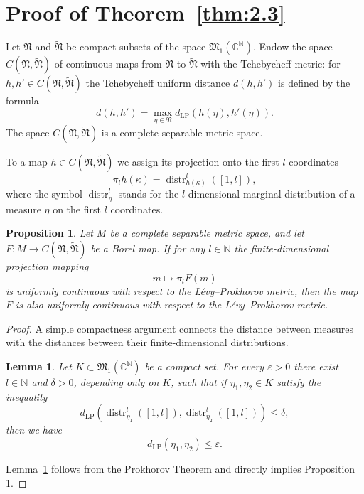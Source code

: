 \documentclass[12pt,a4paper]{article}
\newtheorem{lemma}[theorem]{Lemma}
\newtheorem{proposition}[theorem]{Proposition}
\theoremstyle{definition}
\theoremstyle{remark}
\newcommand{\MM}{{\mathfrak{M}}}
\newcommand{\NN}{{\mathfrak{N}}}
\begin{document}
	\section{Proof of Theorem~\ref{thm:2.3}}
	
	Let $\NN$ and $\widetilde{\NN}$ be compact subsets of the space $\MM_1(\mathbb{C}^{\mathbb{N}})$.
	Endow the space $C(\NN, \widetilde{\NN})$ of continuous maps from $\NN$ to $\widetilde{\NN}$ with the Tchebycheff metric:
	for $h, h' \in C(\NN, \widetilde{\NN})$ the Tchebycheff uniform distance $d(h, h')$ is defined by the formula
	\[
	d(h, h') = \max_{\eta \in \NN} d_{\mathrm{LP}}\left(h(\eta), h'(\eta)\right).
	\]
	The space $C(\NN, \widetilde{\NN})$ is a complete separable metric space.
	
	To a map $h \in C(\NN, \widetilde{\NN})$ we assign its projection onto the 
	first $l$ coordinates
	\[
	\pi_l h(\kappa) = \operatorname{distr}^l_{h(\kappa)}([1, l]),
	\]
	where the symbol $\operatorname{distr}^l_\eta$ stands for the $l$-dimensional marginal distribution of a measure $\eta$ on the first $l$ coordinates.
	
	\begin{proposition}
		\label{prop:3.1}
		Let $M$ be a complete separable metric space, and let  $F \colon M \to C(\NN, \widetilde{\NN})$ be a Borel map.  If for any $l \in \mathbb{N}$ the 
		 finite-dimensional projection mapping
		\[
		m \mapsto \pi_l F(m)
		\]
		is uniformly continuous with respect to the L\'evy--Prokhorov metric, then the map $F$ is also uniformly continuous with respect to the L\'evy--Prokhorov metric.
	\end{proposition}
	
	\begin{proof}
		A  simple compactness argument  connects the distance between measures with
		the distances between their finite-dimensional distributions.
		
		\begin{lemma}
			\label{lem:3.2}
			Let $K \subset \MM_1(\mathbb{C}^{\mathbb{N}})$ be a compact set. For every $\varepsilon > 0$ there exist $l \in \mathbb{N}$
			and $\delta > 0$, depending only on $K$, such that
			if $\eta_1, \eta_2 \in K$ satisfy the inequality
			\[
			d_{\mathrm{LP}}(\operatorname{distr}^l_{\eta_1}([1, l]), \operatorname{distr}^l_{\eta_2}([1, l])) \le \delta,
			\]
			then  we have $$d_{\mathrm{LP}}(\eta_1, \eta_2) \le \varepsilon.$$
		\end{lemma}
		
		Lemma~\ref{lem:3.2} follows  from the Prokhorov Theorem and  directly implies Proposition \ref{prop:3.1}.
		\end{proof}
	
\end{document}
